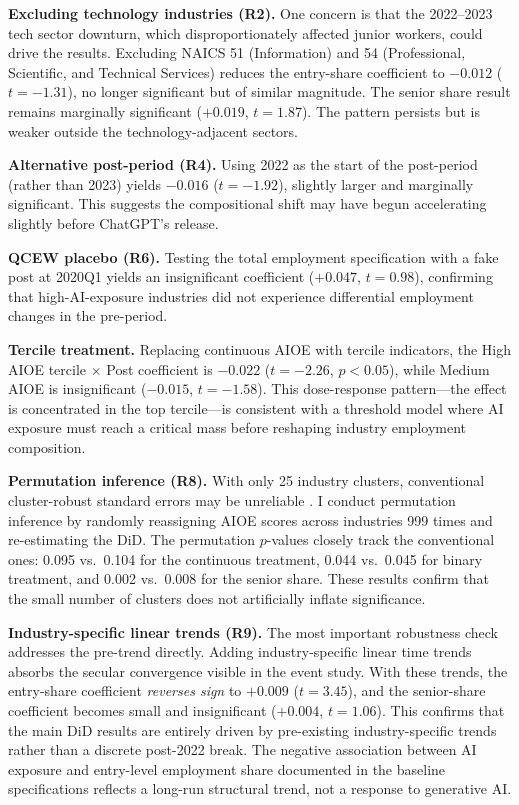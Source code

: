 \documentclass[12pt]{article}
\begin{document}
\textbf{Excluding technology industries (R2).} One concern is that the 2022--2023 tech sector downturn, which disproportionately affected junior workers, could drive the results. Excluding NAICS 51 (Information) and 54 (Professional, Scientific, and Technical Services) reduces the entry-share coefficient to $-0.012$ ($t = -1.31$), no longer significant but of similar magnitude. The senior share result remains marginally significant ($+0.019$, $t = 1.87$). The pattern persists but is weaker outside the technology-adjacent sectors.

\textbf{Alternative post-period (R4).} Using 2022 as the start of the post-period (rather than 2023) yields $-0.016$ ($t = -1.92$), slightly larger and marginally significant. This suggests the compositional shift may have begun accelerating slightly before ChatGPT's release.

\textbf{QCEW placebo (R6).} Testing the total employment specification with a fake post at 2020Q1 yields an insignificant coefficient ($+0.047$, $t = 0.98$), confirming that high-AI-exposure industries did not experience differential employment changes in the pre-period.

\textbf{Tercile treatment.} Replacing continuous AIOE with tercile indicators, the High AIOE tercile $\times$ Post coefficient is $-0.022$ ($t = -2.26$, $p < 0.05$), while Medium AIOE is insignificant ($-0.015$, $t = -1.58$). This dose-response pattern---the effect is concentrated in the top tercile---is consistent with a threshold model where AI exposure must reach a critical mass before reshaping industry employment composition.

\textbf{Permutation inference (R8).} With only 25 industry clusters, conventional cluster-robust standard errors may be unreliable \citep{cameron2008}. I conduct permutation inference by randomly reassigning AIOE scores across industries 999 times and re-estimating the DiD. The permutation $p$-values closely track the conventional ones: 0.095 vs.\ 0.104 for the continuous treatment, 0.044 vs.\ 0.045 for binary treatment, and 0.002 vs.\ 0.008 for the senior share. These results confirm that the small number of clusters does not artificially inflate significance.

\textbf{Industry-specific linear trends (R9).} The most important robustness check addresses the pre-trend directly. Adding industry-specific linear time trends absorbs the secular convergence visible in the event study. With these trends, the entry-share coefficient \emph{reverses sign} to $+0.009$ ($t = 3.45$), and the senior-share coefficient becomes small and insignificant ($+0.004$, $t = 1.06$). This confirms that the main DiD results are entirely driven by pre-existing industry-specific trends rather than a discrete post-2022 break. The negative association between AI exposure and entry-level employment share documented in the baseline specifications reflects a long-run structural trend, not a response to generative AI.
\end{document}
